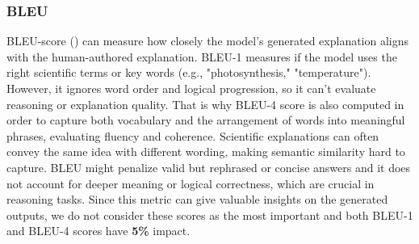 \documentclass{article}
\begin{document}
\subsubsection{BLEU}
BLEU-score (\cite{papineni2002bleu}) can measure how closely the model's generated explanation aligns with the human-authored explanation. BLEU-1 measures if the model uses the right scientific terms or key words (e.g., "photosynthesis," "temperature"). However, it ignores word order and logical progression, so it can’t evaluate reasoning or explanation quality. That is why BLEU-4 score is also computed in order to capture both vocabulary and the arrangement of words into meaningful phrases, evaluating fluency and coherence.
Scientific explanations can often convey the same idea with different wording, making semantic similarity hard to capture.
BLEU might penalize valid but rephrased or concise answers and it does not account for deeper meaning or logical correctness, which are crucial in reasoning tasks. Since this metric can give valuable insights on the generated outputs, we do not consider these scores as the most important and both BLEU-1 and BLEU-4 scores have \textbf{5\%} impact.
\end{document}
